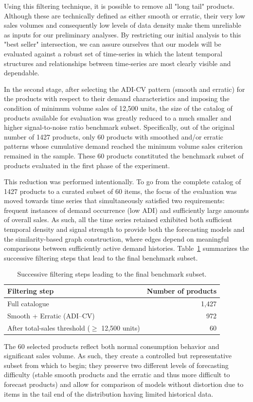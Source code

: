Using this filtering technique, it is possible to remove all "long tail" products. Although these are technically defined as either smooth or erratic, their very low sales volumes and consequently low levels of data density make them unreliable as inputs for our preliminary analyses. By restricting our initial analysis to this "best seller" intersection, we can assure ourselves that our models will be evaluated against a robust set of time-series in which the latent temporal structures and relationships between time-series are most clearly visible and dependable.

In the second stage, after selecting the ADI-CV pattern (smooth and erratic) for the products with respect to their demand characteristics and imposing the condition of minimum volume sales of 12,500 units, the size of the catalog of products available for evaluation was greatly reduced to a much smaller and higher signal-to-noise ratio benchmark subset. Specifically, out of the original number of 1427 products, only 60 products with smoothed and/or erratic patterns whose cumulative demand reached the minimum volume sales criterion remained in the sample. These 60 products constituted the benchmark subset of products evaluated in the first phase of the experiment.

This reduction was performed intentionally. To go from the complete catalog of 1427 products to a curated subset of 60 items, the focus of the evaluation was moved towards time series that simultaneously satisfied two requirements: frequent instances of demand occurrence (low ADI) and sufficiently large amounts of overall sales. As such, all the time series retained exhibited both sufficient temporal density and signal strength to provide both the forecasting models and the similarity-based graph construction, where edges depend on meaningful comparisons between sufficiently active demand histories.
Table~\ref{tab:benchmark_subset} summarizes the successive filtering steps that
lead to the final benchmark subset.

\begin{table}[H]
\centering
\caption{Successive filtering steps leading to the final benchmark subset.}
\label{tab:benchmark_subset}
\begin{tabular}{lr}
\hline
\textbf{Filtering step} & \textbf{Number of products} \\
\hline
Full catalogue & 1{,}427 \\
Smooth + Erratic (ADI--CV) & 972 \\
After total-sales threshold ($\geq$ 12{,}500 units) & 60 \\
\hline
\end{tabular}
\end{table}

The 60 selected products reflect both normal consumption behavior and significant sales volume. As such, they create a controlled but representative subset from which to begin; they preserve two different levels of forecasting difficulty (stable smooth products and the erratic and thus more difficult to forecast products) and allow for comparison of models without distortion due to items in the tail end of the distribution having limited historical data.

